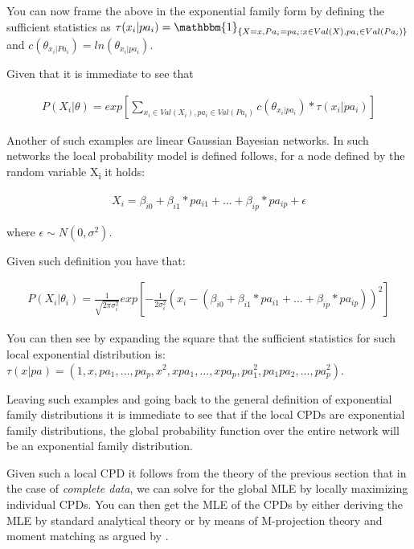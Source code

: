 \documentclass[11pt]{article}
\begin{document}
\begin{article}
You can now frame the above in the exponential family form by
defining the sufficient statistics as \(\tau(x_i | pa_i) =
    \mathbbm{1}_{\{X = x, Pa_i = pa_i : x \in Val(X), pa_i \in
    Val(Pa_i)\}}\) and \(c(\theta_{x_i | Pa_i}) = ln(\theta_{x_i |
    pa_i})\).

Given that it is immediate to see that

\begin{align} \label{eq:multinomial-cpd}
P(X_i|\theta) = exp[\sum_{x_i \in Val(X_i), pa_i \in Val(Pa_i)} c(\theta_{x_i | pa_i}) * \tau(x_i | pa_i)] 
\end{align}

Another of such examples are linear Gaussian Bayesian networks. In
such networks the local probability model is defined follows, for
a node defined by the random variable X\textsubscript{i} it holds:

\begin{align} \label{eq:local-prob-model}
X_i = \beta_{i0} + \beta_{i1} * pa_{i1} + ... + \beta_{ip} * pa_{ip} + \epsilon
\end{align}

where \(\epsilon \sim N(0,\sigma^2)\).

Given such definition you have that:

\begin{align} \label{eq:gaussian-cpd}
P(X_i|\theta_i) = \frac{1}{\sqrt{2\pi\sigma_i^2}} exp[-\frac{1}{2\sigma_i^2} (x_i - (\beta_{i0} + \beta_{i1} * pa_{i1} + ... + \beta_{ip} * pa_{ip}))^2] 
\end{align}

You can then see by expanding the square that the sufficient
statistics for such local exponential distribution is: \(\tau(x|pa) =
    (1,x,pa_1, ..., pa_p, x^2, xpa_1, . . . , xpa_p, pa_1^2, pa_1pa_2,
    . . . , pa_p^2)\).

Leaving such examples and going back to the general definition of
exponential family distributions it is immediate to see that if
the local CPDs are exponential family distributions, the global
probability function over the entire network will be an
exponential family distribution.

Given such a local CPD it follows from the theory of the previous
section that in the case of \emph{complete data}, we can solve for the
global MLE by locally maximizing individual CPDs. You can then get
the MLE of the CPDs by either deriving the MLE by standard
analytical theory or by means of M-projection theory and moment
matching as argued by \cite{koller2009probabilistic}.


\end{article}
\end{document}

